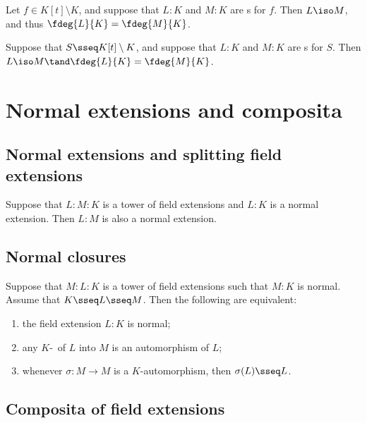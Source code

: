 \documentclass[a4paper]{article}
\begin{document}
\begin{ttheorem}
  Let \( f\in K[t]\setminus K \), and suppose that \( L:K \) and \( M:K \) are \sfe s for \( f \).
  Then \( L\iso M \), and thus \( \fdeg{L}{K}=\fdeg{M}{K} \).
\end{ttheorem}

\begin{ttheorem}
  Suppose that \( S\sseq K[t]\setminus K \), and suppose that \( L:K \) and \( M:K \) are \sfe s for \( S \).
  Then \( L\iso M\tand \fdeg{L}{K}=\fdeg{M}{K} \).
\end{ttheorem}

\section{Normal extensions and composita}
\subsection{Normal extensions and splitting field extensions}

\begin{tproposition}
  Suppose that \( L:M:K \) is a tower of field extensions and \( L:K \) is a normal extension.
  Then \( L:M \) is also a normal extension.
\end{tproposition}

\subsection{Normal closures}
\begin{ttheorem}
  Suppose that \( M:L:K \) is a tower of field extensions such that \( M:K \) is normal.
  Assume that \( K\sseq L\sseq M \).
  Then the following are equivalent: \begin{enumerate}[label=(\roman*)]
    \item the field extension \( L:K \) is normal;
    \item any \( K \)-\homo~of \( L \) into \( M \) is an automorphism of \( L \);
    \item whenever \( \sigma:M\to M \) is a \( K \)-automorphism, then \( \sigma(L)\sseq L \).
  \end{enumerate}
\end{ttheorem}

\subsection{Composita of field extensions}
\end{document}
